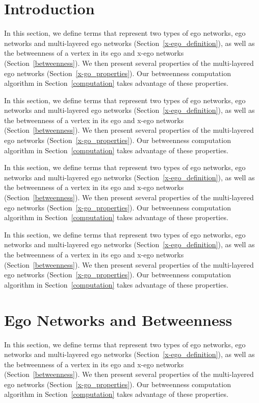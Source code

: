 \documentclass[preprint,12pt,authoryear]{elsarticle}
\theoremstyle{definition}
\begin{document}
\section{Introduction}
In this section, we define terms that represent two types of ego networks, ego networks and multi-layered ego networks (Section~\ref{x-ego_definition}), as well as the betweenness of a vertex in its ego and x-ego networks (Section~\ref{betweenness}).
We then present several properties of the multi-layered ego networks (Section~\ref{x-go_properties}).
Our betweenness computation algorithm in Section~\ref{computation} takes advantage of these properties.

In this section, we define terms that represent two types of ego networks, ego networks and multi-layered ego networks (Section~\ref{x-ego_definition}), as well as the betweenness of a vertex in its ego and x-ego networks (Section~\ref{betweenness}).
We then present several properties of the multi-layered ego networks (Section~\ref{x-go_properties}).
Our betweenness computation algorithm in Section~\ref{computation} takes advantage of these properties.

In this section, we define terms that represent two types of ego networks, ego networks and multi-layered ego networks (Section~\ref{x-ego_definition}), as well as the betweenness of a vertex in its ego and x-ego networks (Section~\ref{betweenness}).
We then present several properties of the multi-layered ego networks (Section~\ref{x-go_properties}).
Our betweenness computation algorithm in Section~\ref{computation} takes advantage of these properties.

In this section, we define terms that represent two types of ego networks, ego networks and multi-layered ego networks (Section~\ref{x-ego_definition}), as well as the betweenness of a vertex in its ego and x-ego networks (Section~\ref{betweenness}).
We then present several properties of the multi-layered ego networks (Section~\ref{x-go_properties}).
Our betweenness computation algorithm in Section~\ref{computation} takes advantage of these properties.

\section{Ego Networks and Betweenness}
\label{Ch_2}

In this section, we define terms that represent two types of ego networks, ego networks and multi-layered ego networks (Section~\ref{x-ego_definition}), as well as the betweenness of a vertex in its ego and x-ego networks (Section~\ref{betweenness}).
We then present several properties of the multi-layered ego networks (Section~\ref{x-go_properties}).
Our betweenness computation algorithm in Section~\ref{computation} takes advantage of these properties.
\end{document}
